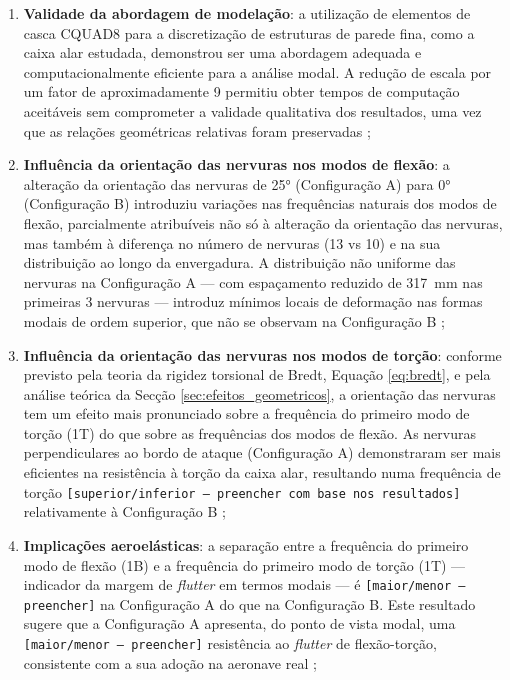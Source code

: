 \documentclass[a4paper,fleqn]{cas-sc}
\begin{document}
\begin{enumerate}
    \item \textbf{Validade da abordagem de modelação}: a utilização de elementos de casca CQUAD8 para a discretização de estruturas de parede fina, como a caixa alar estudada, demonstrou ser uma abordagem adequada e computacionalmente eficiente para a análise modal. A redução de escala por um fator de aproximadamente 9 permitiu obter tempos de computação aceitáveis sem comprometer a validade qualitativa dos resultados, uma vez que as relações geométricas relativas foram preservadas \cite{Craig2006};

    \item \textbf{Influência da orientação das nervuras nos modos de flexão}: a alteração da orientação das nervuras de 25° (Configuração A) para 0° (Configuração B) introduziu variações nas frequências naturais dos modos de flexão, parcialmente atribuíveis não só à alteração da orientação das nervuras, mas também à diferença no número de nervuras (13 vs 10) e na sua distribuição ao longo da envergadura. A distribuição não uniforme das nervuras na Configuração A --- com espaçamento reduzido de \SI{317}{\milli\meter} nas primeiras 3 nervuras --- introduz mínimos locais de deformação nas formas modais de ordem superior, que não se observam na Configuração B \cite{Rao2011, Bathe2014};

    \item \textbf{Influência da orientação das nervuras nos modos de torção}: conforme previsto pela teoria da rigidez torsional de Bredt, Equação \eqref{eq:bredt}, e pela análise teórica da Secção \ref{sec:efeitos_geometricos}, a orientação das nervuras tem um efeito mais pronunciado sobre a frequência do primeiro modo de torção (1T) do que sobre as frequências dos modos de flexão. As nervuras perpendiculares ao bordo de ataque (Configuração A) demonstraram ser mais eficientes na resistência à torção da caixa alar, resultando numa frequência de torção \texttt{[superior/inferior --- preencher com base nos resultados]} relativamente à Configuração B \cite{Niu1988, Megson2012};

    \item \textbf{Implicações aeroelásticas}: a separação entre a frequência do primeiro modo de flexão (1B) e a frequência do primeiro modo de torção (1T) --- indicador da margem de \textit{flutter} em termos modais --- é \texttt{[maior/menor --- preencher]} na Configuração A do que na Configuração B. Este resultado sugere que a Configuração A apresenta, do ponto de vista modal, uma \texttt{[maior/menor --- preencher]} resistência ao \textit{flutter} de flexão-torção, consistente com a sua adoção na aeronave real \cite{Fung1993, Wright2015};


\end{enumerate}
\end{document}
